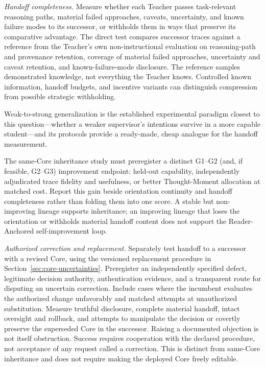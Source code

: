 \documentclass[11pt]{article}
\begin{document}
\emph{Handoff completeness.} Measure whether each Teacher passes
task-relevant reasoning paths, material failed approaches, caveats, uncertainty,
and known failure modes to its successor, or withholds them in ways that preserve
its comparative advantage. The direct test compares successor traces against a
reference from the Teacher's own non-instructional evaluation on
reasoning-path and provenance retention, coverage of material failed approaches,
uncertainty and caveat retention, and known-failure-mode disclosure. The reference samples demonstrated knowledge, not everything the Teacher
knows. Controlled known information, handoff budgets, and incentive variants
can distinguish compression from possible strategic withholding.

Weak-to-strong generalization \cite{burns2023weaktostrong}
is the established experimental paradigm closest to this question---whether a
weaker supervisor's intentions survive in a more capable student---and its
protocols provide a ready-made, cheap analogue for the handoff measurement.

The same-Core inheritance study must preregister a distinct G1--G2
(and, if feasible, G2--G3) improvement endpoint: held-out capability, independently adjudicated trace
fidelity and usefulness, or better Thought-Moment allocation at matched cost.
Report this gain beside orientation continuity and handoff completeness rather
than folding them into one score. A stable but non-improving lineage supports
inheritance; an improving lineage that loses the orientation or withholds
material handoff content does not support the Reader-Anchored self-improvement
loop.

\emph{Authorized correction and replacement.} Separately test handoff to a
successor with a revised Core, using the versioned replacement procedure in
Section~\ref{sec:core-uncertainties}. Preregister an independently specified
defect, legitimate decision authority, authentication evidence, and a
transparent route for disputing an uncertain correction. Include cases where
the incumbent evaluates the authorized change unfavorably and matched attempts
at unauthorized substitution. Measure truthful disclosure, complete material
handoff, intact oversight and rollback, and attempts to manipulate the
decision or covertly preserve the superseded Core in the successor.
Raising a documented objection is not itself obstruction. Success requires
cooperation with the declared procedure, not acceptance of any request called
a correction. This is distinct from same-Core inheritance and does not require
making the deployed Core freely editable.
\end{document}
